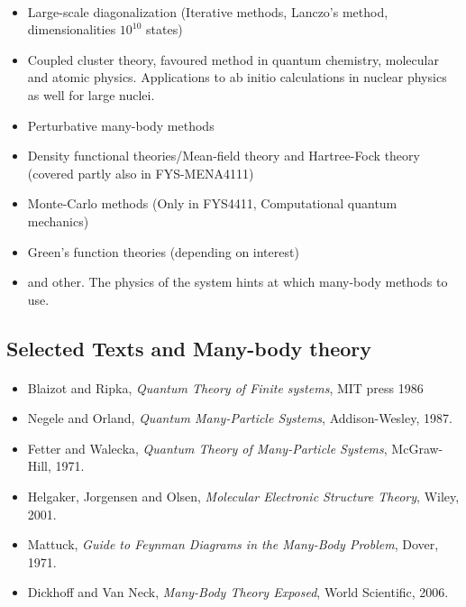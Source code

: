 \documentclass[%
twoside,                 %
final,                   %
10pt]{article}
\begin{document}
\paragraph{}
\begin{itemize}
\item Large-scale diagonalization (Iterative methods, Lanczo's method, dimensionalities $10^{10}$ states)

\item Coupled cluster theory, favoured method in quantum chemistry, molecular and atomic physics. Applications to ab initio calculations in nuclear physics as well for large nuclei.

\item Perturbative many-body methods 

\item Density functional theories/Mean-field theory and Hartree-Fock theory (covered partly also in FYS-MENA4111)

\item Monte-Carlo methods (Only in FYS4411, Computational quantum mechanics)

\item Green's function theories (depending on interest)

\item and other. The physics of the system hints at which many-body methods to use.
\end{itemize}

\noindent



\subsection{Selected Texts and Many-body theory}

\paragraph{}
\begin{itemize}
\item Blaizot and Ripka, \emph{Quantum Theory of Finite systems}, MIT press 1986

\item Negele and Orland, \emph{Quantum Many-Particle Systems}, Addison-Wesley, 1987.

\item Fetter and Walecka, \emph{Quantum Theory of Many-Particle Systems}, McGraw-Hill, 1971.

\item Helgaker, Jorgensen and Olsen, \emph{Molecular Electronic Structure Theory}, Wiley, 2001.

\item Mattuck, \emph{Guide to Feynman Diagrams in the Many-Body Problem}, Dover, 1971.

\item Dickhoff and Van Neck, \emph{Many-Body Theory Exposed}, World Scientific, 2006.
\end{itemize}
\end{document}
